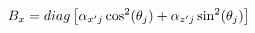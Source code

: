\vspace{-0.1cm}
\begin{equation}
    B_x = diag\left[\alpha_{x'j}\cos^2(\theta_j) + \alpha_{z'j}\sin^2(\theta_j)\right]
    \label{eq:rotated_coef}
    \vspace{-0.05cm}
\end{equation}